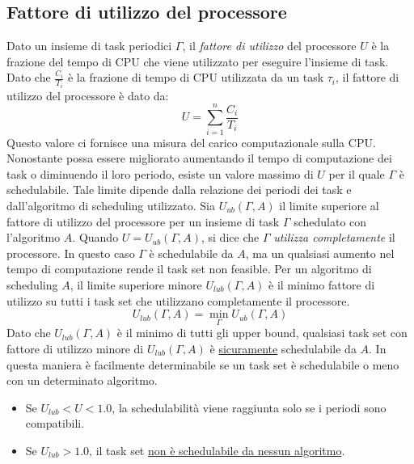 \documentclass[12pt]{article}
\begin{document}
\subsection{Fattore di utilizzo del processore}
Dato un insieme di task periodici $\Gamma$, il \textit{fattore di utilizzo} del processore $U$ è la frazione del tempo di CPU che viene utilizzato per eseguire l'insieme di task.
Dato che $\frac{C_i}{T_i}$ è la frazione di tempo di CPU utilizzata da un task $\tau_i$, il fattore di utilizzo del processore è dato da:
\begin{equation}
    U = \sum_{i=1}^{n} \frac{C_i}{T_i}
\end{equation}
Questo valore ci fornisce una misura del carico computazionale sulla CPU. Nonostante possa essere migliorato aumentando il tempo di computazione dei task o diminuendo il loro periodo, esiste un valore massimo 
di $U$ per il quale $\Gamma$ è schedulabile. Tale limite dipende dalla relazione dei periodi dei task e dall'algoritmo di scheduling utilizzato.
Sia $U_{ub}(\Gamma,A)$ il limite superiore al fattore di utilizzo del processore per un insieme di task $\Gamma$ schedulato con l'algoritmo $A$.
Quando $U = U_{ub}(\Gamma,A)$, si dice che $\Gamma$ \textit{utilizza completamente} il processore. In questo caso $\Gamma$ è schedulabile da $A$, ma un qualsiasi aumento nel tempo di computazione rende il task set non feasible.
Per un algoritmo di scheduling $A$, il limite superiore minore $U_{lub}(\Gamma,A)$ è il minimo fattore di utilizzo su tutti i task set che utilizzano completamente il processore.
\begin{equation}
    U_{lub}(\Gamma,A) = \min_{\Gamma } U_{ub}(\Gamma,A)
\end{equation}
Dato che $U_{lub}(\Gamma,A)$ è il minimo di tutti gli upper bound, qualsiasi task set con fattore di utilizzo minore di $U_{lub}(\Gamma,A)$ è \underline{sicuramente} schedulabile da $A$. In questa maniera 
è facilmente determinabile se un task set è schedulabile o meno con un determinato algoritmo. 
\begin{itemize}
    \item Se $ U_{lub}< U < 1.0$, la schedulabilità viene raggiunta solo se i periodi sono compatibili.
    \item Se $U_{lub} > 1.0 $, il task set \underline{non è schedulabile da nessun algoritmo}.
\end{itemize}
\end{document}
